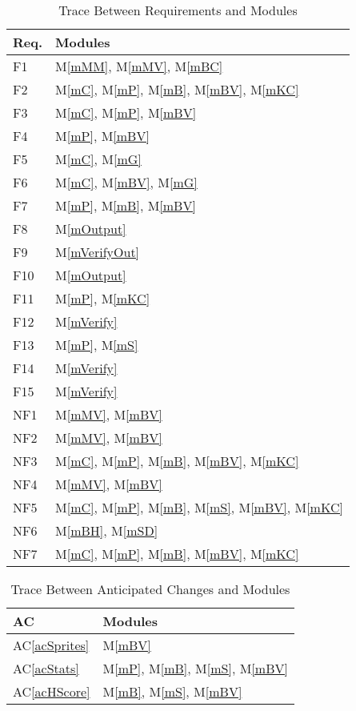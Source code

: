 \documentclass[12pt, titlepage]{article}
\newcommand{\acref}[1]{AC\ref{#1}}
\newcommand{\mref}[1]{M\ref{#1}}
\begin{document}
\begin{table}[H]
\centering
\begin{tabular}{p{} p{}}
\toprule
\textbf{Req.} & \textbf{Modules}\\
\midrule
F1 & \mref{mMM}, \mref{mMV}, \mref{mBC}\\
F2 & \mref{mC}, \mref{mP}, \mref{mB}, \mref{mBV}, \mref{mKC}\\
F3 & \mref{mC}, \mref{mP}, \mref{mBV}\\
F4 & \mref{mP}, \mref{mBV}\\
F5 & \mref{mC}, \mref{mG}\\
F6 & \mref{mC}, \mref{mBV}, \mref{mG}\\
F7 & \mref{mP}, \mref{mB}, \mref{mBV}\\
F8 & \mref{mOutput}\\
F9 & \mref{mVerifyOut}\\
F10 & \mref{mOutput}\\
F11 & \mref{mP}, \mref{mKC}\\
F12 & \mref{mVerify}\\
F13 & \mref{mP}, \mref{mS}\\
F14 & \mref{mVerify}\\
F15 & \mref{mVerify}\\
NF1 & \mref{mMV}, \mref{mBV}\\
NF2 & \mref{mMV}, \mref{mBV}\\
NF3 & \mref{mC}, \mref{mP}, \mref{mB}, \mref{mBV}, \mref{mKC}\\
NF4 & \mref{mMV}, \mref{mBV}\\
NF5 & \mref{mC}, \mref{mP}, \mref{mB}, \mref{mS}, \mref{mBV}, \mref{mKC}\\%
NF6 & \mref{mBH}, \mref{mSD}\\
NF7 & \mref{mC}, \mref{mP}, \mref{mB}, \mref{mBV}, \mref{mKC}\\%
\bottomrule
\end{tabular}
\caption{Trace Between Requirements and Modules}
\label{TblRT}
\end{table}

\begin{table}[H]
\centering
\begin{tabular}{p{} p{}}
\toprule
\textbf{AC} & \textbf{Modules}\\
\midrule
\acref{acSprites} & \mref{mBV}\\
\acref{acStats} & \mref{mP}, \mref{mB}, \mref{mS}, \mref{mBV}\\
\acref{acHScore} & \mref{mB}, \mref{mS}, \mref{mBV}\\
\bottomrule
\end{tabular}
\caption{Trace Between Anticipated Changes and Modules}
\label{TblACT}
\end{table}
\end{document}

